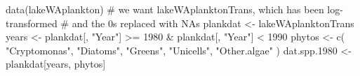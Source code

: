 \begin{Schunk}
\begin{Sinput}
 data(lakeWAplankton)
 # we want lakeWAplanktonTrans, which has been log-transformed
 # and the 0s replaced with NAs
 plankdat <- lakeWAplanktonTrans
 years <- plankdat[, "Year"] >= 1980 & plankdat[, "Year"] < 1990
 phytos <- c(
   "Cryptomonas", "Diatoms", "Greens",
   "Unicells", "Other.algae"
 )
 dat.spp.1980 <- plankdat[years, phytos]
\end{Sinput}
\end{Schunk}
